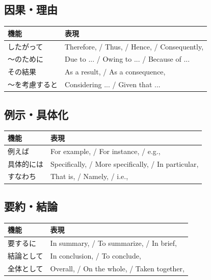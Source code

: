 \subsection*{因果・理由}

\begin{table}[H]
\centering
\small
\begin{tabular}{ll}
\toprule
機能 & 表現 \\
\midrule
したがって & Therefore, / Thus, / Hence, / Consequently, \\
〜のために & Due to ... / Owing to ... / Because of ... \\
その結果 & As a result, / As a consequence, \\
〜を考慮すると & Considering ... / Given that ... \\
\bottomrule
\end{tabular}
\end{table}

\subsection*{例示・具体化}

\begin{table}[H]
\centering
\small
\begin{tabular}{ll}
\toprule
機能 & 表現 \\
\midrule
例えば & For example, / For instance, / e.g., \\
具体的には & Specifically, / More specifically, / In particular, \\
すなわち & That is, / Namely, / i.e., \\
\bottomrule
\end{tabular}
\end{table}

\subsection*{要約・結論}

\begin{table}[H]
\centering
\small
\begin{tabular}{ll}
\toprule
機能 & 表現 \\
\midrule
要するに & In summary, / To summarize, / In brief, \\
結論として & In conclusion, / To conclude, \\
全体として & Overall, / On the whole, / Taken together, \\
\bottomrule
\end{tabular}
\end{table}
